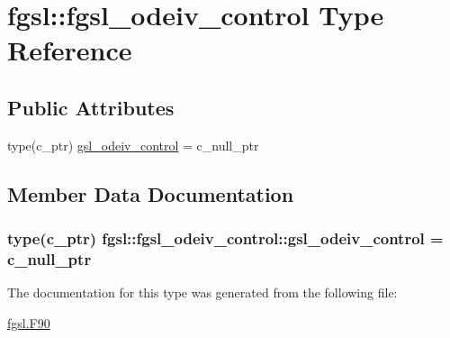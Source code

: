 \hypertarget{structfgsl_1_1fgsl__odeiv__control}{\section{fgsl\-:\-:fgsl\-\_\-odeiv\-\_\-control Type Reference}
\label{structfgsl_1_1fgsl__odeiv__control}
}
\subsection*{Public Attributes}
\begin{DoxyCompactItemize}
\item 
type(c\-\_\-ptr) \hyperlink{structfgsl_1_1fgsl__odeiv__control_a1c25e770ecfccfaa80cc8edd0a9b462d}{gsl\-\_\-odeiv\-\_\-control} = c\-\_\-null\-\_\-ptr
\end{DoxyCompactItemize}


\subsection{Member Data Documentation}
\hypertarget{structfgsl_1_1fgsl__odeiv__control_a1c25e770ecfccfaa80cc8edd0a9b462d}{
\subsubsection[{gsl\-\_\-odeiv\-\_\-control}]{\setlength{\rightskip}{0pt plus 5cm}type(c\-\_\-ptr) fgsl\-::fgsl\-\_\-odeiv\-\_\-control\-::gsl\-\_\-odeiv\-\_\-control = c\-\_\-null\-\_\-ptr}}\label{structfgsl_1_1fgsl__odeiv__control_a1c25e770ecfccfaa80cc8edd0a9b462d}


The documentation for this type was generated from the following file\-:\begin{DoxyCompactItemize}
\item 
\hyperlink{fgsl_8F90}{fgsl.\-F90}\end{DoxyCompactItemize}
